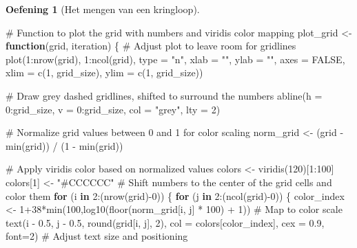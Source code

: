 \documentclass[
  a4paper,
]{scrbook}
\newenvironment{Shaded}{\begin{snugshade}}{\end{snugshade}}
\newcommand{\AttributeTok}[1]{\textcolor[rgb]{0.40,0.45,0.13}{#1}}
\newcommand{\CommentTok}[1]{\textcolor[rgb]{0.37,0.37,0.37}{#1}}
\newcommand{\ConstantTok}[1]{\textcolor[rgb]{0.56,0.35,0.01}{#1}}
\newcommand{\ControlFlowTok}[1]{\textcolor[rgb]{0.00,0.23,0.31}{\textbf{#1}}}
\newcommand{\DecValTok}[1]{\textcolor[rgb]{0.68,0.00,0.00}{#1}}
\newcommand{\FloatTok}[1]{\textcolor[rgb]{0.68,0.00,0.00}{#1}}
\newcommand{\FunctionTok}[1]{\textcolor[rgb]{0.28,0.35,0.67}{#1}}
\newcommand{\NormalTok}[1]{\textcolor[rgb]{0.00,0.23,0.31}{#1}}
\newcommand{\OtherTok}[1]{\textcolor[rgb]{0.00,0.23,0.31}{#1}}
\newcommand{\SpecialCharTok}[1]{\textcolor[rgb]{0.37,0.37,0.37}{#1}}
\newcommand{\StringTok}[1]{\textcolor[rgb]{0.13,0.47,0.30}{#1}}
\theoremstyle{definition}
\newtheorem{exercise}{Oefening}[chapter]
\theoremstyle{remark}
\begin{document}
\begin{exercise}[Het mengen van een
kringloop]
\begin{Shaded}
\begin{Highlighting}[]
\CommentTok{\# Function to plot the grid with numbers and viridis color mapping}
\NormalTok{plot\_grid }\OtherTok{\textless{}{-}} \ControlFlowTok{function}\NormalTok{(grid, iteration) \{}
  \CommentTok{\# Adjust plot to leave room for gridlines}
  \FunctionTok{plot}\NormalTok{(}\DecValTok{1}\SpecialCharTok{:}\FunctionTok{nrow}\NormalTok{(grid), }\DecValTok{1}\SpecialCharTok{:}\FunctionTok{ncol}\NormalTok{(grid), }\AttributeTok{type =} \StringTok{"n"}\NormalTok{, }\AttributeTok{xlab =} \StringTok{""}\NormalTok{, }\AttributeTok{ylab =} \StringTok{""}\NormalTok{, }\AttributeTok{axes =} \ConstantTok{FALSE}\NormalTok{, }
       \AttributeTok{xlim =} \FunctionTok{c}\NormalTok{(}\DecValTok{1}\NormalTok{, grid\_size), }\AttributeTok{ylim =} \FunctionTok{c}\NormalTok{(}\DecValTok{1}\NormalTok{, grid\_size))}
  
  \CommentTok{\# Draw grey dashed gridlines, shifted to surround the numbers}
  \FunctionTok{abline}\NormalTok{(}\AttributeTok{h =} \DecValTok{0}\SpecialCharTok{:}\NormalTok{grid\_size, }\AttributeTok{v =} \DecValTok{0}\SpecialCharTok{:}\NormalTok{grid\_size, }\AttributeTok{col =} \StringTok{"grey"}\NormalTok{, }\AttributeTok{lty =} \DecValTok{2}\NormalTok{) }
  
  \CommentTok{\# Normalize grid values between 0 and 1 for color scaling}
\NormalTok{  norm\_grid }\OtherTok{\textless{}{-}}\NormalTok{ (grid }\SpecialCharTok{{-}} \FunctionTok{min}\NormalTok{(grid)) }\SpecialCharTok{/}\NormalTok{ (}\DecValTok{1} \SpecialCharTok{{-}} \FunctionTok{min}\NormalTok{(grid))}
  
  \CommentTok{\# Apply viridis color based on normalized values}
\NormalTok{  colors }\OtherTok{\textless{}{-}} \FunctionTok{viridis}\NormalTok{(}\DecValTok{120}\NormalTok{)[}\DecValTok{1}\SpecialCharTok{:}\DecValTok{100}\NormalTok{]}
\NormalTok{  colors[}\DecValTok{1}\NormalTok{] }\OtherTok{\textless{}{-}} \StringTok{"\#CCCCCC"}
  \CommentTok{\# Shift numbers to the center of the grid cells and color them}
  \ControlFlowTok{for}\NormalTok{ (i }\ControlFlowTok{in} \DecValTok{2}\SpecialCharTok{:}\NormalTok{(}\FunctionTok{nrow}\NormalTok{(grid)}\SpecialCharTok{{-}}\DecValTok{0}\NormalTok{)) \{}
    \ControlFlowTok{for}\NormalTok{ (j }\ControlFlowTok{in} \DecValTok{2}\SpecialCharTok{:}\NormalTok{(}\FunctionTok{ncol}\NormalTok{(grid)}\SpecialCharTok{{-}}\DecValTok{0}\NormalTok{)) \{}
\NormalTok{      color\_index }\OtherTok{\textless{}{-}} \DecValTok{1}\SpecialCharTok{+}\DecValTok{38}\SpecialCharTok{*}\FunctionTok{min}\NormalTok{(}\DecValTok{100}\NormalTok{,}\FunctionTok{log10}\NormalTok{(}\FunctionTok{floor}\NormalTok{(norm\_grid[i, j] }\SpecialCharTok{*} \DecValTok{100}\NormalTok{) }\SpecialCharTok{+} \DecValTok{1}\NormalTok{))  }\CommentTok{\# Map to color scale}
      \FunctionTok{text}\NormalTok{(i }\SpecialCharTok{{-}} \FloatTok{0.5}\NormalTok{, j }\SpecialCharTok{{-}} \FloatTok{0.5}\NormalTok{, }\FunctionTok{round}\NormalTok{(grid[i, j], }\DecValTok{2}\NormalTok{), }\AttributeTok{col =}\NormalTok{ colors[color\_index], }\AttributeTok{cex =} \FloatTok{0.9}\NormalTok{, }\AttributeTok{font=}\DecValTok{2}\NormalTok{)  }\CommentTok{\# Adjust text size and positioning}
    

\end{Highlighting}
\end{Shaded}
\end{exercise}
\end{document}
